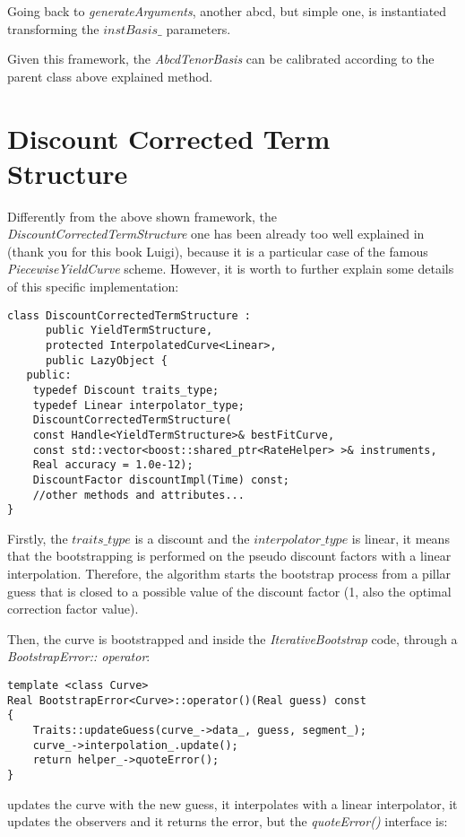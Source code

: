 Going back to \textit{generateArguments}, another abcd, but simple one, is instantiated transforming the $instBasis\_$ parameters.

Given this framework, the \textit{AbcdTenorBasis} can be calibrated according to the parent class above explained method.

\section {Discount Corrected Term Structure}

Differently from the above shown framework, the \textit{DiscountCorrectedTermStructure} one has been already too well explained in \cite{ballabio_implementing_quantlib} (thank you for this book Luigi), because it is a particular case of the famous \textit{PiecewiseYieldCurve} scheme.
However, it is worth to further explain some details of this specific implementation:

\begin{lstlisting}
class DiscountCorrectedTermStructure :
      public YieldTermStructure,
      protected InterpolatedCurve<Linear>,
      public LazyObject {
   public:
    typedef Discount traits_type;
    typedef Linear interpolator_type;
    DiscountCorrectedTermStructure(
    const Handle<YieldTermStructure>& bestFitCurve,
    const std::vector<boost::shared_ptr<RateHelper> >& instruments,
    Real accuracy = 1.0e-12);
    DiscountFactor discountImpl(Time) const;
    //other methods and attributes...
}
\end{lstlisting}

Firstly, the $traits\_type$ is a discount and the $interpolator\_type$ is linear, it means that the bootstrapping is performed on the pseudo discount factors with a linear interpolation.
Therefore, the algorithm starts the bootstrap process from a pillar guess that is closed to a possible value of the discount factor (1, also the optimal correction factor value).

Then, the curve is bootstrapped and inside the \textit{IterativeBootstrap} code, through a \textit{BootstrapError:: operator}:

\begin{lstlisting}
template <class Curve>
Real BootstrapError<Curve>::operator()(Real guess) const 
{
    Traits::updateGuess(curve_->data_, guess, segment_);
    curve_->interpolation_.update();
    return helper_->quoteError();
}
\end{lstlisting}

updates the curve with the new guess, it interpolates with a linear interpolator, it updates the observers and it returns the error, but the \textit{quoteError()} interface is:

